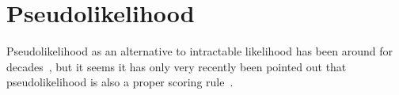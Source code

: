 \documentclass[a4paper,oneside,12pt,english]{report}
\def\expv#1#2{\bigl\langle#1\bigr\rangle_{#2}}
\def\Lset{\mathcal{L}}
\def\Rset{\mathcal{R}}
\begin{document}




\section{Pseudolikelihood}
Pseudolikelihood as an alternative to intractable likelihood has been around for decades~\cite{Besag_pseudolikelihood}, but it seems it has only very recently been pointed out that pseudolikelihood is also a proper scoring rule~\cite{Dawid_Musio_ThApp_PSR_2014,Dawid_discrete_PSR}. 
\end{document}
